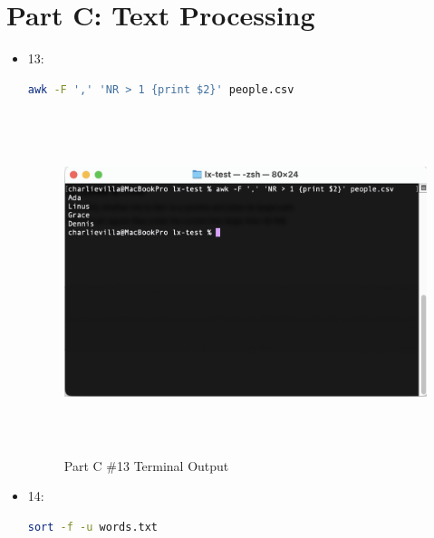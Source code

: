 \section{Part C: Text Processing}
\begin{itemize}
    \item 13: 
        \begin{lstlisting}[language=Bash]
awk -F ',' 'NR > 1 {print $2}' people.csv
        \end{lstlisting}

        \begin{figure}[H]
            \centering
            \includegraphics[width=15cm, height=10cm]{png/LinuxProblemSetPicsPNG/part_c_13.png}
            \caption{Part C \#13 Terminal Output}
            \label{fig:part C 13}
        \end{figure}
    \item 14: 
        \begin{lstlisting}[language=Bash]
sort -f -u words.txt
        \end{lstlisting}


\end{itemize}
